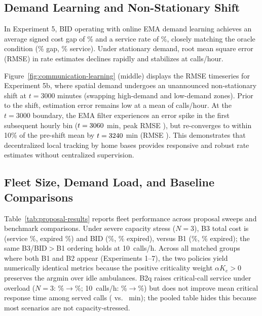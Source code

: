 \documentclass{article}
\begin{document}
\subsection{Demand Learning and Non-Stationary Shift}
In Experiment 5, BID operating with online EMA demand learning achieves an average signed cost gap of \LearnedBIDCostGapPercent\% and a service rate of \LearnedBIDServicePercent\%, closely matching the oracle condition (\OracleBIDCostGapPercent\% gap, \OracleBIDServicePercent\% service). Under stationary demand, root mean square error (RMSE) in rate estimates declines rapidly and stabilizes at \StationaryLearnedRMSE{} calls/hour.

Figure~\ref{fig:communication-learning} (middle) displays the RMSE timeseries for Experiment 5b, where spatial demand undergoes an unannounced non-stationary shift at $t = 3000$ minutes (swapping high-demand and low-demand zones). Prior to the shift, estimation error remains low at a mean of \ShiftPreShiftMeanRMSE{} calls/hour. At the $t = 3000$ boundary, the EMA filter experiences an error spike in the first subsequent hourly bin ($t = 3060{}$ min, peak RMSE \ShiftPeakRMSE{}), but re-converges to within 10\% of the pre-shift mean by $t = 3240{}$ min (RMSE \ShiftRecoveryRMSE{}). This demonstrates that decentralized local tracking by home bases provides responsive and robust rate estimates without centralized supervision.

\subsection{Fleet Size, Demand Load, and Baseline Comparisons}\label{sec:results-fleet}
Table~\ref{tab:proposal-results} reports fleet performance across proposal sweeps and benchmark comparisons. Under severe capacity stress ($N=3$), B3 total cost is \BThreeTotalCostNThree{} (service \BThreeServicePercentNThree\%, expired \BThreeExpiredPercentNThree\%) and BID \BIDTotalCostNThree{} (\BIDServicePercentNThree\%, \BIDExpiredPercentNThree\% expired), versus B1 \BOneTotalCostNThree{} (\BOneServicePercentNThree\%, \BOneExpiredPercentNThree\% expired); the same B3/BID$>$B1 ordering holds at 10~calls/h. Across all \NBOneBTwoMatchedGroups{} matched groups where both B1 and B2 appear (Experiments 1--7), the two policies yield numerically identical metrics because the positive criticality weight $\alpha K_e > 0$ preserves the argmin over idle ambulances. B2q raises critical-call service under overload ($N=3$: \BOneCritServiceThree\%$\to$\BTwoQCritServiceThree\%; 10~calls/h: \BOneCritServiceTenCalls\%$\to$\BTwoQCritServiceTenCalls\%) but does not improve mean critical response time among served calls (\BOneCritRespMinutesThree{} vs.\ \BTwoQCritRespMinutesThree{} min); the pooled table hides this because most scenarios are not capacity-stressed.
\end{document}
